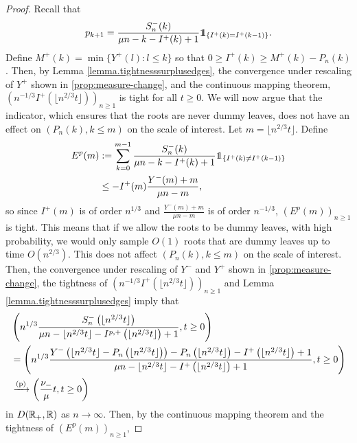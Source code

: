 \begin{proof}
Recall that
$$p_{k+1}=\frac{S_n^{-}(k)}{\mu n - k -I^{+}(k)+1}\one_{\{I^{+}(k)=I^{+}(k-1)\}}.$$
Define $M^+(k)=\min\{Y^+(l):l\leq k\}$ so that $0\geq I^{+}(k)\geq M^+(k)-P_n(k)$.  Then, by Lemma \ref{lemma.tightnesssurplusedges}, the convergence under rescaling of $Y^+$ shown in \cref{prop:measure-change}, and the continuous mapping theorem, $\left(n^{-1/3}I^+(\lfloor n^{2/3} t \rfloor)\right)_{n\geq 1}$ is tight for all $t\geq 0$.
We will now argue that the indicator, which ensures that the roots are never dummy leaves, does not have an effect on $(P_n(k),k\leq m)$ on the scale of interest. Let $m=\lfloor n^{2/3}t\rfloor$. Define
\begin{align*}\begin{split}
E^p(m)&:=\sum_{k=0}^{m-1}\frac{S_n^{-}(k)}{\mu n - k -I^{+}(k)+1}\one_{\{I^{+}(k)\neq I^{+}(k-1)\}}\\
&\leq -I^{+}(m) \frac{Y^-(m)+m}{\mu n - m},\end{split}\end{align*}
so since $I^{+}(m)$ is of order $n^{1/3}$ and $\frac{Y^{-}(m)+m}{\mu n - m}$ is of order $n^{-1/3}$, $(E^p(m))_{n\geq 1}$ is tight.  This means that if we allow the roots to be dummy leaves, with high probability, we would only sample $O(1)$ roots that are dummy leaves up to time $O(n^{2/3})$. This does not affect $(P_n(k),k\leq m)$ on the scale of interest. \\
 Then, the convergence under rescaling of $Y^-$ and $Y^+$ shown in \cref{prop:measure-change}, the tightness of $\left(n^{-1/3}I^{+}(\lfloor n^{2/3} t \rfloor)\right)_{n\geq 1}$ and Lemma \ref{lemma.tightnesssurplusedges} imply that
\begin{align}\begin{split}\label{eq.convergenceprob}
  &\left(n^{1/3}\frac{S_n^{-}\left(\lfloor n^{2/3} t \rfloor\right)}{\mu n - \lfloor n^{2/3} t \rfloor -I^{p,+}\left(\lfloor n^{2/3} t \rfloor\right)+1},t\geq 0\right)\\
 &=\left(n^{1/3}\frac{Y^-\left(\lfloor n^{2/3} t \rfloor-P_n\left(\lfloor n^{2/3} t \rfloor\right)\right)-P_n\left(\lfloor n^{2/3} t \rfloor\right)-I^{+}\left(\lfloor n^{2/3} t \rfloor\right)+1}{\mu n - \lfloor n^{2/3} t \rfloor -I^{+}\left(\lfloor n^{2/3} t \rfloor\right)+1},t\geq 0\right)\\
 &\xrightarrow[]{\mathrm{(p)}} \left(\frac{\nu_-}{\mu}t,t\geq 0\right)\end{split}\end{align}
in $D({\mathbb R}_+,{\mathbb R})$ as $n\to \infty$. 
Then, by the continuous mapping theorem and the tightness of $(E^p(m))_{n\geq 1}$,

\end{proof}
